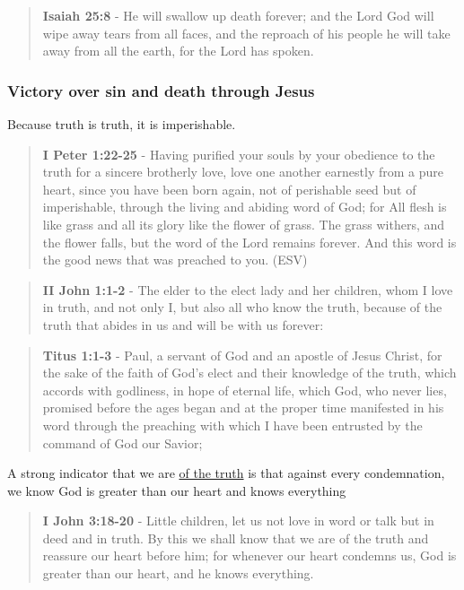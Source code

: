 \documentclass[11pt]{article}
\begin{document}
\begin{quote}
\textbf{Isaiah 25:8} - He will swallow up death forever; and the Lord God will wipe away tears from all faces, and the reproach of his people he will take away from all the earth, for the Lord has spoken.
\end{quote}

\subsubsection{Victory over sin and death through Jesus}
\label{sec:org06d1bb1}
Because truth is truth, it is imperishable.

\begin{quote}
\textbf{I Peter 1:22-25} - Having purified your souls by your obedience to the truth for a sincere brotherly love, love one another earnestly from a pure heart, since you have been born again, not of perishable seed but of imperishable, through the living and abiding word of God; for All flesh is like grass and all its glory like the flower of grass. The grass withers, and the flower falls, but the word of the Lord remains forever. And this word is the good news that was preached to you. (ESV)
\end{quote}

\begin{quote}
\textbf{II John 1:1-2} - The elder to the elect lady and her children, whom I love in truth, and not only I, but also all who know the truth, because of the truth that abides in us and will be with us forever:
\end{quote}

\begin{quote}
\textbf{Titus 1:1-3} - Paul, a servant of God and an apostle of Jesus Christ, for the sake of the faith of God's elect and their knowledge of the truth, which accords with godliness, in hope of eternal life, which God, who never lies, promised before the ages began and at the proper time manifested in his word through the preaching with which I have been entrusted by the command of God our Savior;
\end{quote}

A strong indicator that we are \uline{of the truth} is that against every condemnation, we know God is greater than our heart and knows everything

\begin{quote}
\textbf{I John 3:18-20} - Little children, let us not love in word or talk but in deed and in truth. By this we shall know that we are of the truth and reassure our heart before him; for whenever our heart condemns us, God is greater than our heart, and he knows everything.
\end{quote}
\end{document}
